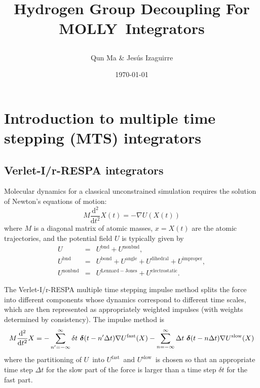 \documentclass[11pt]{article}
\newcommand{\MOLLY}{\textsc{MOLLY\ }}
\begin{document}
\thispagestyle{empty}

\title{
\begin{Large}
Hydrogen Group Decoupling For \MOLLY Integrators
\end{Large}
}
\author{Qun Ma \& Jes\'us Izaguirre}
\bigskip
\date{\today}
\maketitle

\parskip 0.3cm


\section{Introduction to multiple time stepping (MTS) integrators}
\subsection{Verlet-I/r-RESPA integrators}
Molecular dynamics for a classical
 unconstrained simulation requires the
 solution of Newton's equations of motion:
\begin{equation}
M\frac{\displaystyle {\mathrm d}^2}{\displaystyle {\mathrm d}t^2}{X}(t) = -\nabla U(X(t))
\label{eq:newton}
\end{equation}
where $M$ is a diagonal matrix of atomic masses, $x=X(t)$ are the atomic
trajectories, and the potential field $U$ is typically given by
\begin{eqnarray}
U &= &U^{\mathrm{bnd}}+U^{\mathrm{nonbnd}}, \\
U^{\mathrm{bnd}} & = &U^{\mathrm {bond}}+U^{\mathrm
{angle}}+U^{\mathrm{dihedral}}+U^{\mathrm{improper}}, \\ 
U^{\mathrm{nonbnd}} & = &U^{\mathrm{Lennard-Jones}}+U^{\mathrm{electrostatic}}.
\label{eq:potential}
\end{eqnarray}

The Verlet-I/r-RESPA multiple time stepping impulse method splits the
force into different components whose dynamics correspond to different
time scales, which are then represented as appropriately weighted
impulses (with weights determined by consistency). The impulse method
is
\begin{equation}
M\frac{\mathrm{d^{2}}}{\mathrm{d}t\mathrm{^{2}}}X=-\sum_{n^{\prime}=-\infty}^{\infty
}\delta t\ \mbox{\boldmath$\delta$}(t-n^{\prime}\Delta t)\nabla U^{\mathrm{fast}
}(X)-\sum_{n=-\infty}^{\infty}\Delta t\ \mbox{\boldmath$\delta$}(t-n\Delta
t)\nabla U^{\mathrm{slow}}(X) \label{eq:mts000}
\end{equation}
where the partitioning of{ }$U$\/\ into{ }$U^{\mathrm{fast}}$\/{\ }and{
}$U^{\mathrm{slow}}$\/{\ }is chosen so that an appropriate time step $\Delta
t$\/ for the slow part of the force is larger than a time step{ }$\delta t$
for the fast part.
\end{document}
